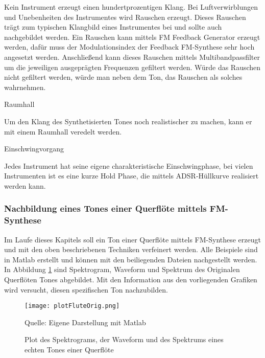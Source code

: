 Kein Instrument erzeugt einen hundertprozentigen Klang. Bei Luftverwirblungen und Unebenheiten des Instrumentes wird Rauschen erzeugt. Dieses Rauschen trägt zum typischen Klangbild eines Instrumentes bei und sollte auch nachgebildet werden. Ein Rauschen kann mittels FM Feedback Generator erzeugt werden, dafür muss der Modulationsindex der Feedback FM-Synthese sehr hoch angesetzt werden. Anschließend kann dieses Rauschen mittels Multibandpassfilter um die jeweiligen ausgeprägten Frequenzen gefiltert werden. Würde das Rauschen nicht gefiltert werden, würde man neben dem Ton, das Rauschen als solches wahrnehmen.


Raumhall

Um den Klang des Synthetisierten Tones noch realistischer zu machen, kann er mit einem Raumhall veredelt werden.

Einschwingvorgang

Jedes Instrument hat seine eigene charakteristische Einschwingphase, bei vielen Instrumenten ist es eine kurze Hold Phase, die mittels ADSR-Hüllkurve realisiert werden kann.


\FloatBarrier
\subsubsection{Nachbildung eines Tones einer Querflöte mittels FM-Synthese}

Im Laufe dieses Kapitels soll ein Ton einer Querflöte mittels FM-Synthese erzeugt und mit den oben beschriebenen Techniken verfeinert werden. Alle Beispiele sind in Matlab erstellt und können mit den beiliegenden Dateien nachgestellt werden. In Abbildung \ref{fig:plotFluteOrig} sind Spektrogram, Waveform und Spektrum des Originalen Querflöten Tones abgebildet. Mit den Information aus den vorliegenden Grafiken wird versucht, diesen spezifischen Ton nachzubilden.

\begin{figure} [ht]
\centering
  \texttt{[image: plotFluteOrig.png]}
\caption{Plot des Spektrograms, der Waveform und des Spektrums eines echten Tones einer Querflöte}
\label{fig:plotFluteOrig}
Quelle: Eigene Darstellung mit Matlab
\end{figure}

